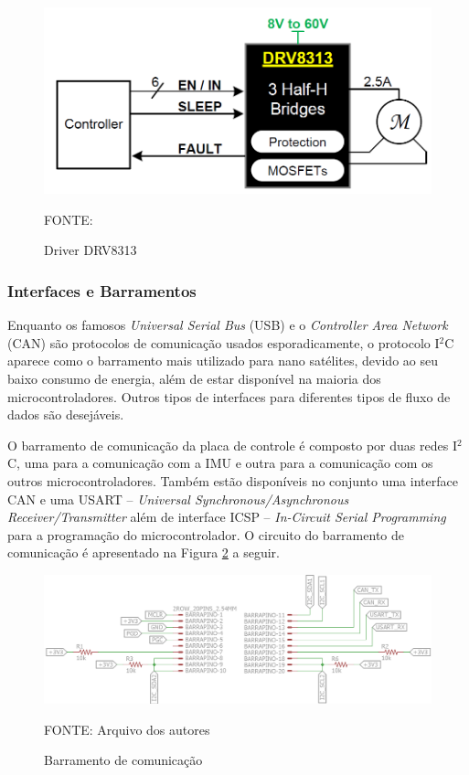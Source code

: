 \documentclass[
	12pt,				%
	openany,			%
	twoside,			%
	a4paper,			%
	english,			%
	french,				%
	spanish,			%
	brazil,				%
	oldfontcommands
	]{abntex2}
\begin{document}
\begin{figure}[th]
	\caption{Driver DRV8313}
	\centering
	\includegraphics[width=0.6\linewidth]{./figs/DRV8313-fig}
	
	\begin{small}
		FONTE: \cite{DRV8313}
	\end{small}
	\label{fig:Driver}
\end{figure}


\subsubsection{Interfaces e Barramentos}

Enquanto os famosos \textit{Universal Serial Bus} (USB) e o \textit{Controller Area Network} (CAN) são protocolos de comunicação usados esporadicamente, o protocolo I$^{2}$C aparece como o barramento mais utilizado para nano satélites, devido ao seu baixo consumo de energia, além de estar disponível na maioria dos microcontroladores. Outros tipos de interfaces para diferentes tipos de fluxo de dados são desejáveis. \cite{STATEOFART}

O barramento de comunicação da placa de controle é composto por duas redes I$^{2}$C, uma para a comunicação com a IMU e outra para a comunicação com os outros microcontroladores. Também estão disponíveis no conjunto uma interface CAN e uma USART – \textit{Universal Synchronous/Asynchronous Receiver/Transmitter} além de interface ICSP – \textit{In-Circuit Serial Programming} para a programação do microcontrolador. O circuito do barramento de comunicação é apresentado na Figura \ref{fig:Barra_pino_master} a seguir.

\begin{figure}[th]
	\caption{Barramento de comunicação}
	\centering
	\includegraphics[width=0.8\linewidth]{./figs/Barra_pino_master}
	
	\begin{small}
		FONTE: Arquivo dos autores
	\end{small}
	\label{fig:Barra_pino_master}
\end{figure}
\end{document}
